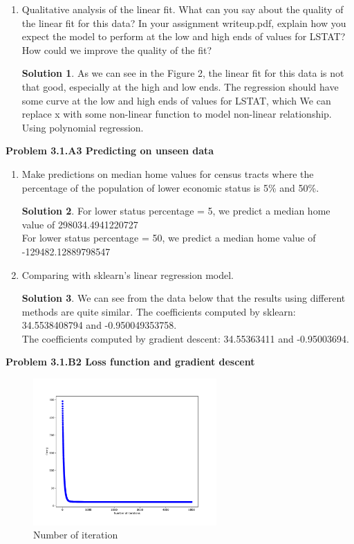 \documentclass[]{book}
\theoremstyle{definition}
\newtheorem*{soln}{Solution}
\begin{document}
\begin{enumerate}
	\item Qualitative analysis of the linear fit. What can you say about the quality of the linear fit for this data? In your assignment writeup.pdf, explain how you expect the model to perform at the low and high ends of values for LSTAT? How could we improve the quality of the fit?
	\begin{soln}
		As we can see in the Figure 2, the linear fit for this data is not that good, especially at the high and low ends. The regression should have some curve at the low and high ends of values for LSTAT, which We can replace x with some non-linear function to model non-linear relationship. Using polynomial regression. 
	\end{soln}
	
\end{enumerate}
\textbf{Problem 3.1.A3 Predicting on unseen data}
\begin{enumerate}
	\item Make predictions on median home values for census tracts where the percentage of the population of lower economic status is 5\% and 50\%.
	\begin{soln}
		For lower status percentage = 5, we predict a median home value of 298034.4941220727\\
		For lower status percentage = 50, we predict a median home value of -129482.12889798547
	\end{soln}
	\item Comparing with sklearn's linear regression model.
	\begin{soln} We can see from the data below that the results using different methods are quite similar.
		The coefficients computed by sklearn:  34.5538408794  and  -0.950049353758. \\
		The coefficients computed by gradient descent:  34.55363411 and -0.95003694.
		
		
	\end{soln}
	
\end{enumerate}
\textbf{Problem 3.1.B2 Loss function and gradient descent}\\
\begin{figure}[h]
	\centering
	\includegraphics[width=7cm]{fig5.pdf}
	\caption{Number of iteration}
	\label{fig:4}
\end{figure}
\end{document}
